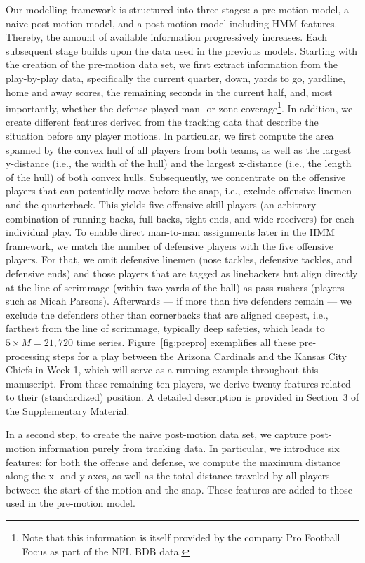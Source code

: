 \documentclass[namedate,webpdf,modern,medium]{oup-authoring-template}
\begin{document}
Our modelling framework is structured into three stages: a pre-motion model, a naive post-motion model, and a post-motion model including HMM features. Thereby, the amount of available information progressively increases. Each subsequent stage builds upon the data used in the previous models.
Starting with the creation of the pre-motion data set, we first extract information from the play-by-play data, specifically the current quarter, down, yards to go, yardline, home and away scores, the remaining seconds in the current half, and, most importantly, whether the defense played man- or zone coverage\footnote{Note that this information is itself provided by the company Pro Football Focus as part of the NFL BDB data.}. In addition, we create different features derived from the tracking data that describe the situation before any player motions. In particular, we first compute the area spanned by the convex hull of all players from both teams, as well as the largest y-distance (i.e., the width of the hull) and the largest x-distance (i.e., the length of the hull) of both convex hulls. 
Subsequently, we concentrate on the offensive players that can potentially move before the snap, i.e., exclude offensive linemen and the quarterback. This yields five offensive skill players (an arbitrary combination of running backs, full backs, tight ends, and wide receivers) for each individual play. 
To enable direct man-to-man assignments later in the HMM framework, we match the number of defensive players with the five offensive players. For that, we omit defensive linemen (nose tackles, defensive tackles, and defensive ends) and those players that are tagged as linebackers but align directly at the line of scrimmage (within two yards of the ball) as pass rushers (players such as Micah Parsons).
Afterwards --- if more than five defenders remain --- we exclude the defenders other than cornerbacks that are aligned deepest, i.e., farthest from the line of scrimmage, typically deep safeties, which leads to $5 \times M = 21{,}720$ time series. Figure~\ref{fig:prepro} exemplifies all these pre-processing steps for a play between the Arizona Cardinals and the Kansas City Chiefs in Week 1, which will serve as a running example throughout this manuscript.
From these remaining ten players, we derive twenty features related to their (standardized) position. A detailed description is provided in Section~3 of the  Supplementary Material.

In a second step, to create the naive post-motion data set, we capture post-motion information purely from tracking data. In particular, we introduce six features: for both the offense and defense, we compute the maximum distance along the x- and y-axes, as well as the total
distance traveled by all players between the start of the motion and the snap. These features are added to those used in the pre-motion model.
\end{document}
